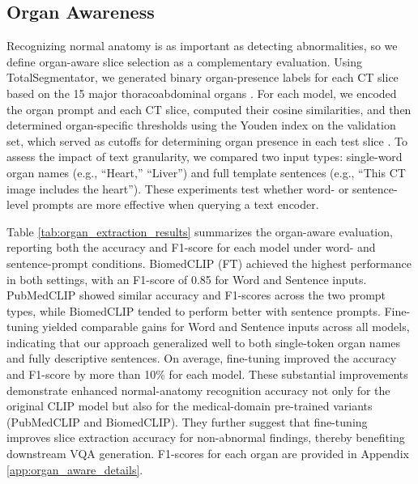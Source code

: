 \documentclass[bioengineering,article,submit,pdftex,moreauthors]{Definitions/mdpi}
\begin{document}
\subsection{Organ Awareness}\label{sec:organ_aware}
Recognizing normal anatomy is as important as detecting abnormalities, so we deﬁne organ-aware slice selection as a complementary evaluation. 
Using TotalSegmentator, we generated binary organ-presence labels for each CT slice based on the 15 major thoracoabdominal organs \cite{wasserthal_totalsegmentator_2023}. 
For each model, we encoded the organ prompt and each CT slice, computed their cosine similarities, and then determined organ-specific thresholds using the Youden index on the validation set, which served as cutoffs for determining organ presence in each test slice \cite{youden_index_1950}. 
To assess the impact of text granularity, we compared two input types: single-word organ names (e.g., “Heart,” “Liver”) and full template sentences (e.g., “This CT image includes the heart”).
These experiments test whether word- or sentence-level prompts are more effective when querying a text encoder. 


Table \ref{tab:organ_extraction_results} summarizes the organ-aware evaluation, reporting both the accuracy and F1-score for each model under word- and sentence-prompt conditions. 
BiomedCLIP (FT) achieved the highest performance in both settings, with an F1-score of 0.85 for Word and Sentence inputs. 
PubMedCLIP showed similar accuracy and F1-scores across the two prompt types, while BiomedCLIP tended to perform better with sentence prompts. 
Fine-tuning yielded comparable gains for Word and Sentence inputs across all models, indicating that our approach generalized well to both single-token organ names and fully descriptive sentences. 
On average, fine-tuning improved the accuracy and F1-score by more than 10\% for each model. 
These substantial improvements demonstrate enhanced normal-anatomy recognition accuracy not only for the original CLIP model but also for the medical-domain pre-trained variants (PubMedCLIP and BiomedCLIP). 
They further suggest that fine-tuning improves slice extraction accuracy for non-abnormal findings, thereby benefiting downstream VQA generation.
F1-scores for each organ are provided in Appendix \ref{app:organ_aware_details}.
\end{document}
